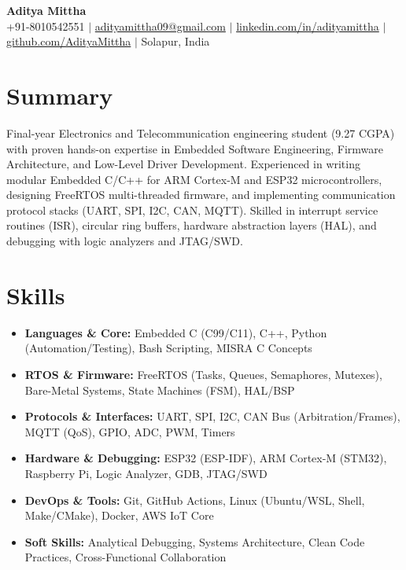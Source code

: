 \documentclass[letterpaper,10pt]{article}
\begin{document}
\begin{center}
  {\LARGE \textbf{Aditya Mittha}} \\[3pt]
  \small
  +91-8010542551 \enspace $|$ \enspace
  \href{mailto:adityamittha09@gmail.com}{adityamittha09@gmail.com} \enspace $|$ \enspace
  \href{https://www.linkedin.com/in/adityamittha}{linkedin.com/in/adityamittha} \enspace $|$ \enspace
  \href{https://github.com/AdityaMittha}{github.com/AdityaMittha} \enspace $|$ \enspace
  Solapur, India
\end{center}

\vspace{-14pt}

\section{Summary}
\small
Final-year Electronics and Telecommunication engineering student (9.27 CGPA) with proven hands-on expertise in Embedded Software Engineering, Firmware Architecture, and Low-Level Driver Development. Experienced in writing modular Embedded C/C++ for ARM Cortex-M and ESP32 microcontrollers, designing FreeRTOS multi-threaded firmware, and implementing communication protocol stacks (UART, SPI, I2C, CAN, MQTT). Skilled in interrupt service routines (ISR), circular ring buffers, hardware abstraction layers (HAL), and debugging with logic analyzers and JTAG/SWD.

\vspace{-4pt}

\section{Skills}
\small
\begin{itemize}[leftmargin=0.18in, label={}, topsep=0pt, parsep=1pt, itemsep=1pt]
  \item \textbf{Languages \& Core:} Embedded C (C99/C11), C++, Python (Automation/Testing), Bash Scripting, MISRA C Concepts
  \item \textbf{RTOS \& Firmware:} FreeRTOS (Tasks, Queues, Semaphores, Mutexes), Bare-Metal Systems, State Machines (FSM), HAL/BSP
  \item \textbf{Protocols \& Interfaces:} UART, SPI, I2C, CAN Bus (Arbitration/Frames), MQTT (QoS), GPIO, ADC, PWM, Timers
  \item \textbf{Hardware \& Debugging:} ESP32 (ESP-IDF), ARM Cortex-M (STM32), Raspberry Pi, Logic Analyzer, GDB, JTAG/SWD
  \item \textbf{DevOps \& Tools:} Git, GitHub Actions, Linux (Ubuntu/WSL, Shell, Make/CMake), Docker, AWS IoT Core
  \item \textbf{Soft Skills:} Analytical Debugging, Systems Architecture, Clean Code Practices, Cross-Functional Collaboration
\end{itemize}
\end{document}
